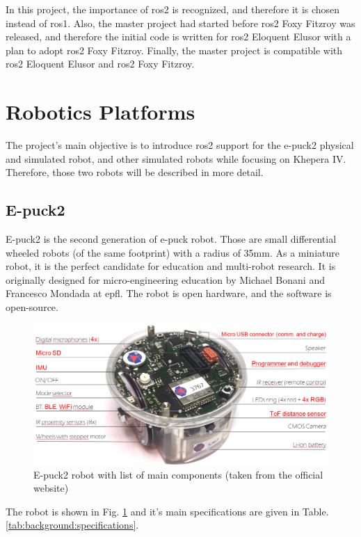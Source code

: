 In this project, the importance of \ac{ros2} is recognized, and therefore it is chosen instead of \ac{ros}1. Also, the master project had started before \ac{ros2} Foxy Fitzroy was released, and therefore the initial code is written for \ac{ros2} Eloquent Elusor with a plan to adopt \ac{ros2} Foxy Fitzroy. Finally, the master project is compatible with \ac{ros2} Eloquent Elusor and \ac{ros2} Foxy Fitzroy.

\section{Robotics Platforms}
The project's main objective is to introduce \ac{ros2} support for the e-puck2 physical and simulated robot, and other simulated robots while focusing on Khepera IV. Therefore, those two robots will be described in more detail.

\subsection{E-puck2}
E-puck2 is the second generation of e-puck robot\cite{mondada_e-puck_nodate}. Those are small differential wheeled robots (of the same footprint) with a radius of 35mm. As a miniature robot, it is the perfect candidate for education and multi-robot research. It is originally designed for micro-engineering education by Michael Bonani and Francesco Mondada at \ac{epfl}. The robot is open hardware, and the software is open-source.

\begin{figure}[H]
    \centering
    \includegraphics[width=\textwidth]{background/figures/e-puck2-features.png}
    \caption{E-puck2 robot with list of main components (taken from the official website)}
    \label{fig:background:e-puck2}
\end{figure}

The robot is shown in Fig. \ref{fig:background:e-puck2} and it's main specifications are given in Table. \ref{tab:background:specifications}.

